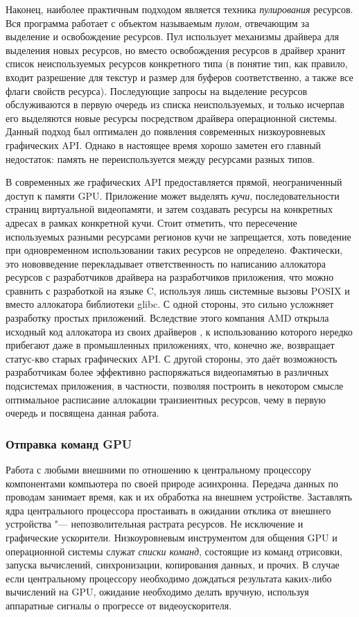 Наконец, наиболее практичным подходом является техника \textit{пулирования} ресурсов.
Вся программа работает с объектом называемым \textit{пулом}, отвечающим за выделение и освобождение ресурсов.
Пул использует механизмы драйвера для выделения новых ресурсов, но вместо освобождения ресурсов в драйвер хранит список неиспользуемых ресурсов конкретного типа (в понятие тип, как правило, входит разрешение для текстур и размер для буферов соответственно, а также все флаги свойств ресурса).
Последующие запросы на выделение ресурсов обслуживаются в первую очередь из списка неиспользуемых, и только исчерпав его выделяются новые ресурсы посредством драйвера операционной системы.
Данный подход был оптимален до появления современных низкоуровневых графических API.
Однако в настоящее время хорошо заметен его главный недостаток: память не переиспользуется между ресурсами разных типов.

В современных же графических API предоставляется прямой, неограниченный доступ к памяти GPU.
Приложение может выделять \textit{кучи}, последовательности страниц виртуальной видеопамяти, и затем создавать ресурсы на конкретных адресах в рамках конкретной кучи.
Стоит отметить, что пересечение используемых разными ресурсами регионов кучи не запрещается, хоть поведение при одновременном использовании таких ресурсов не определено.
Фактически, это нововведение перекладывает ответственность по написанию аллокатора ресурсов с разработчиков драйвера на разработчиков приложения, что можно сравнить с разработкой на языке C, используя лишь системные вызовы POSIX  и  вместо аллокатора библиотеки glibc.
С одной стороны, это сильно усложняет разработку простых приложений.
Вследствие этого компания AMD открыла исходный код аллокатора из своих драйверов \cite{VMA}, к использованию которого нередко прибегают даже в промышленных приложениях, что, конечно же, возвращает статус-кво старых графических API.
С другой стороны, это даёт возможность разработчикам более эффективно распоряжаться видеопамятью в различных подсистемах приложения, в частности, позволяя построить в некотором смысле оптимальное расписание аллокации транзиентных ресурсов, чему в первую очередь и посвящена данная работа.

\subsubsection{Отправка команд GPU}
Работа с любыми внешними по отношению к центральному процессору компонентами компьютера по своей природе асинхронна.
Передача данных по проводам занимает время, как и их обработка на внешнем устройстве.
Заставлять ядра центрального процессора простаивать в ожидании отклика от внешнего устройства "--- непозволительная растрата ресурсов.
Не исключение и графические ускорители.
Низкоуровневым инструментом для общения GPU и операционной системы служат \textit{списки команд}, состоящие из команд отрисовки, запуска вычислений, синхронизации, копирования данных, и прочих.
В случае если центральному процессору необходимо дождаться результата каких-либо вычислений на GPU, ожидание необходимо делать вручную, используя аппаратные сигналы о прогрессе от видеоускорителя.


